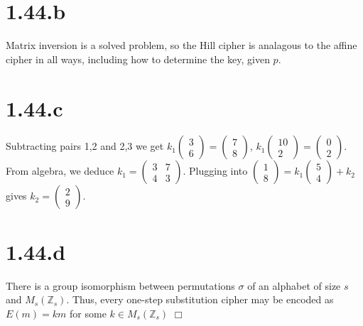 \documentclass{article}
\begin{document}
\section*{1.44.b}
Matrix inversion is a solved problem, so the Hill cipher is analagous to the affine cipher in all ways, including how to determine the key, given $p$.
\section*{1.44.c}
Subtracting pairs 1,2 and 2,3 we get $k_1\left(\begin{smallmatrix}3\\6\end{smallmatrix}\right) =
\left(\begin{smallmatrix}7\\8\end{smallmatrix}\right)$,
$k_1\left(\begin{smallmatrix}10\\2\end{smallmatrix}\right) =
\left(\begin{smallmatrix}0\\2\end{smallmatrix}\right)$. From algebra, we deduce $k_1 = \left(\begin{smallmatrix}3 & 7\\4 & 3\end{smallmatrix}\right)$. Plugging into $\left(\begin{smallmatrix}1\\8\end{smallmatrix}\right) = k_1\left(\begin{smallmatrix}5\\4\end{smallmatrix}\right) + k_2$ gives $k_2 = \left(\begin{smallmatrix}2\\9\end{smallmatrix}\right)$.
\section*{1.44.d}
There is a group isomorphism between permutations $\sigma$ of an alphabet of size $s$ and $M_s(\mathbb{Z}_s)$. Thus, every one-step substitution cipher may be encoded as $E(m) = km$ for some $k \in M_s(\mathbb{Z}_s)$ $\Box$
\end{document}
